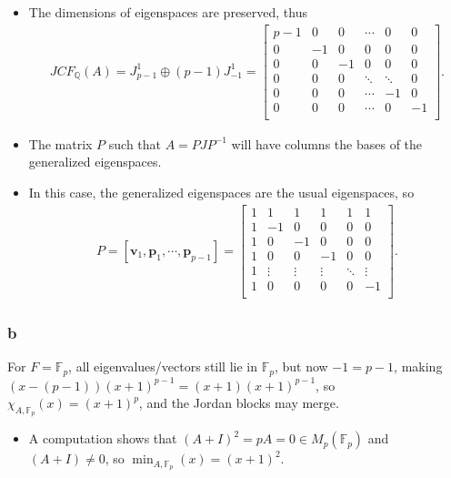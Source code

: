 \begin{solution}
\begin{itemize}
\item
  The dimensions of eigenspaces are preserved, thus
  \begin{align*}
  JCF_{\mathbb{Q}}(A)
  =  J_{p-1}^{1} \oplus (p-1)J_{-1}^1
  =
  \left[\begin{array}{r|r|r|r|r|r}
  p-1 & 0 & 0 & \cdots & 0 & 0 \\
  \hline
  0& -1 & 0 & 0 & 0 & 0 \\ \hline
  0& 0 & -1 & 0 & 0 & 0 \\ \hline
  0& 0 & 0 & \ddots & \ddots & 0 \\ \hline
  0& 0 & 0 & \cdots & -1 & 0 \\ \hline
  0& 0 & 0 & \cdots & 0 & -1 \\
  \end{array}\right]
  .\end{align*}
\item
  The matrix \(P\) such that \(A = PJP^{-1}\) will have columns the
  bases of the generalized eigenspaces.
\item
  In this case, the generalized eigenspaces are the usual eigenspaces,
  so
  \begin{align*}
  P = [\mathbf{v}_1, \mathbf{p}_1, \cdots, \mathbf{p}_{p-1}] =
  \left[\begin{array}{rrrrrr}
  1 & 1 & 1 & 1 & 1 & 1  \\
  1 & -1 & 0 & 0 & 0 & 0 \\
  1 & 0 & -1 & 0 & 0 & 0 \\
  1 & 0 & 0 & -1 & 0 & 0 \\
  1 & \vdots & \vdots & \vdots & \ddots & \vdots\\
  1 & 0 & 0 & 0 & 0 & -1 \\
  \end{array}\right]
  .\end{align*}
\end{itemize}

\hypertarget{b-101}{%
\subsubsection{b}\label{b-101}}

For \(F = {\mathbb{F}}_p\), all eigenvalues/vectors still lie in
\({\mathbb{F}}_p\), but now \(-1 = p-1\), making
\((x-(p-1))(x+1)^{p-1} = (x+1)(x+1)^{p-1}\), so
\(\chi_{A, {\mathbb{F}}_p}(x) = (x+1)^p\), and the Jordan blocks may
merge.

\begin{itemize}
\tightlist
\item
  A computation shows that \((A+I)^2 = pA = 0 \in M_p({\mathbb{F}}_p)\)
  and \((A+I) \neq 0\), so \(\min_{A, {\mathbb{F}}_p}(x) = (x+1)^2\).


\end{itemize}
\end{solution}

